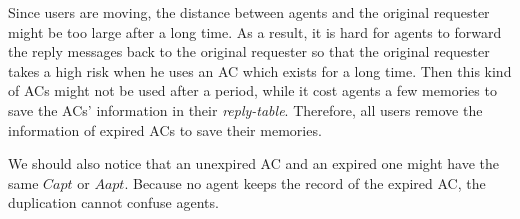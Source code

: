 Since users are moving, the distance between agents and the original requester might be too large after a long time. As a result, it is hard for agents to forward the reply messages back to the original requester so that the original requester takes a high risk when he uses an AC which exists for a long time. Then this kind of ACs might not be used after a period, while it cost agents a few memories to save the ACs' information in their \textit{reply-table}. Therefore, all users remove the information of expired ACs to save their memories.

We should also notice that an unexpired AC and an expired one might have the same $Capt$ or $Aapt$. Because no agent keeps the record of the expired AC, the duplication cannot confuse agents.





